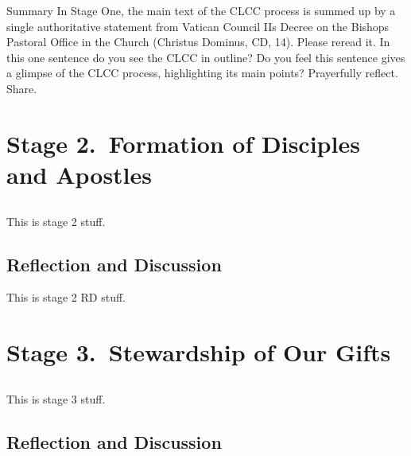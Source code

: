 \documentclass[oneside]{book}
\begin{document}
Summary In Stage One, the main text of the CLCC process is summed up by a single
authoritative statement from Vatican Council IIs Decree on the Bishops Pastoral
Office in the Church (Christus Dominus, CD, 14). Please reread it. In this one
sentence do you see the CLCC in outline? Do you feel this sentence gives a
glimpse of the CLCC process, highlighting its main points? Prayerfully
reflect. Share.


\chapter{Stage 2.\ Formation of Disciples and Apostles}

\section*{} 

This is stage 2 stuff.


\section{Reflection and Discussion}

This is stage 2 RD stuff.


\chapter{Stage 3.\ Stewardship of Our Gifts}

\section*{} 

This is stage 3 stuff.


\section{Reflection and Discussion}
\end{document}
